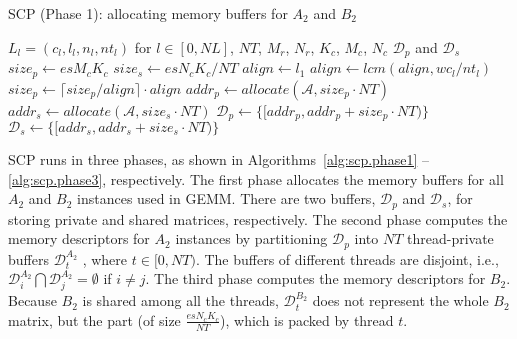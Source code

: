 \begin{algorithm}[t]
  \caption{SCP (Phase 1): allocating memory buffers
  for $A_2$ and $B_2$}
  \label{alg:scp.phase1}
  \begin{algorithmic}[1]
    \REQUIRE $L_l = (c_l,l_l,n_l,nt_l)$ for $l \in [0, NL]$, $NT$,
    $M_r$, $N_r$, $K_c$, $M_c$, $N_c$
    \ENSURE $\mathcal{D}_p$ and $\mathcal{D}_s$ 
    \STATE $size_p \gets es M_c K_c$ \label{line:size.p}
    \STATE $size_s \gets es N_c K_c / NT$ \label{line:size.s}
    \STATE $align \gets l_1$ \label{line:align.init}
     \label{line:align.for}
     \label{line:align.type}
    \STATE $align \gets lcm(align, wc_l / nt_l)$ \label{line:align.update}
    \ENDIF
    \ENDFOR \label{line:align.endfor}
    \STATE $size_p \gets \lceil size_p / align \rceil \cdot align$ \label{line:align}
    \STATE $addr_p \gets allocate(\mathcal{A}, size_p \cdot NT)$ \label{line:alloc.begin}
    \STATE $addr_s \gets allocate(\mathcal{A}, size_s \cdot NT)$ \label{line:alloc.end}
    \STATE $\mathcal{D}_p \gets \lbrace [addr_p, addr_p + size_p \cdot NT) \rbrace$ \label{line:d.begin}
    \STATE $\mathcal{D}_s \gets \lbrace [addr_s, addr_s + size_s \cdot NT) \rbrace$ \label{line:d.end}
  \end{algorithmic}
\end{algorithm}

SCP runs in three phases, as shown in 
Algorithms~\ref{alg:scp.phase1} -- \ref{alg:scp.phase3},
respectively.  The first phase allocates the
memory buffers for all $A_2$ and $B_2$
instances used in GEMM. There are two buffers, $\mathcal{D}_p$ and $\mathcal{D}_s$,
for storing private and shared matrices, respectively.
The second phase computes the 
memory descriptors for $A_2$ instances
by partitioning $\mathcal{D}_p$ into $NT$ thread-private buffers
$\mathcal{D}_t^{A_2}$ , where $t \in [0, NT)$.
The buffers of different threads are disjoint,
i.e., $\mathcal{D}_i^{A_2} \bigcap \mathcal{D}_j^{A_2} = \emptyset$ if $i \ne j$.
The third phase computes the
memory descriptors for $B_2$.
Because $B_2$ is shared among all the threads,
$\mathcal{D}_t^{B_2}$ does not represent the whole $B_2$ matrix,
but the part (of size $\frac{es N_c K_c}{NT}$),
which is packed by thread $t$.


